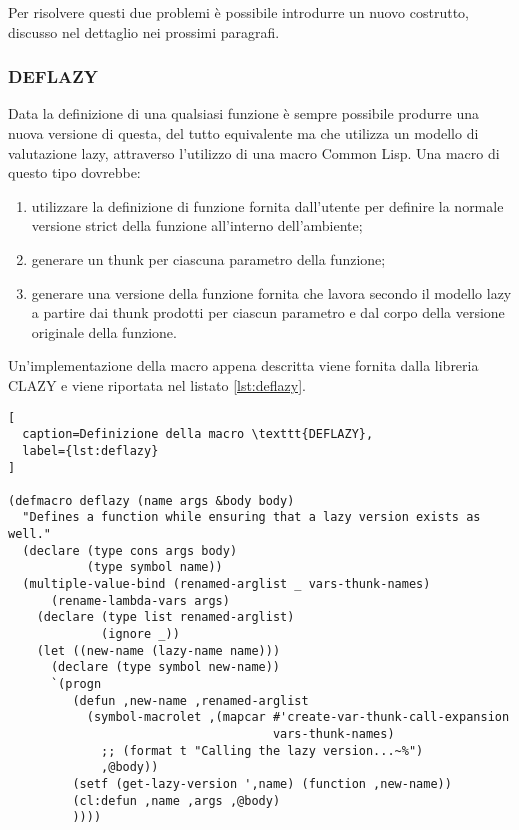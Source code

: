 Per risolvere questi due problemi è possibile introdurre un nuovo costrutto,
discusso nel dettaglio nei prossimi paragrafi.

\subsubsection{DEFLAZY}

Data la definizione di una qualsiasi funzione è sempre possibile produrre una
nuova versione di questa, del tutto equivalente ma che utilizza un modello di
valutazione lazy, attraverso l’utilizzo di una macro Common Lisp. Una macro di
questo tipo dovrebbe:

\begin{enumerate}

\item utilizzare la definizione di funzione fornita dall'utente per definire la
normale versione strict della funzione all'interno dell'ambiente;

\item generare un thunk per ciascuna parametro della funzione;

\item generare una versione della funzione fornita che lavora secondo il modello
lazy a partire dai thunk prodotti per ciascun parametro e dal corpo della
versione originale della funzione.

\end{enumerate}

Un'implementazione della macro appena descritta viene fornita dalla libreria
CLAZY \cite{DBLP:journals/corr/Antoniotti14} e viene riportata nel listato
\ref{lst:deflazy}.

\begin{lstlisting}[
  caption=Definizione della macro \texttt{DEFLAZY},
  label={lst:deflazy}
]

(defmacro deflazy (name args &body body)
  "Defines a function while ensuring that a lazy version exists as well."
  (declare (type cons args body)
           (type symbol name))
  (multiple-value-bind (renamed-arglist _ vars-thunk-names)
      (rename-lambda-vars args)
    (declare (type list renamed-arglist)
             (ignore _))
    (let ((new-name (lazy-name name)))
      (declare (type symbol new-name))
      `(progn
         (defun ,new-name ,renamed-arglist
           (symbol-macrolet ,(mapcar #'create-var-thunk-call-expansion
                                     vars-thunk-names)
             ;; (format t "Calling the lazy version...~%")
             ,@body))
         (setf (get-lazy-version ',name) (function ,new-name))
         (cl:defun ,name ,args ,@body)
         ))))

\end{lstlisting}


